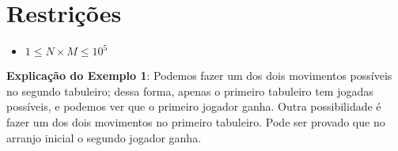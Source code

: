 
\section*{Restrições}

\begin{itemize}
\item $1 \leq N\times M \leq 10^5$
\end{itemize}

\exemplo

\bigskip
\textbf{Explicação do Exemplo 1}: Podemos fazer um dos dois movimentos possíveis no segundo tabuleiro; dessa forma, apenas o primeiro tabuleiro tem jogadas possíveis, e podemos ver que o primeiro jogador ganha. Outra possibilidade é fazer um dos dois movimentos no primeiro tabuleiro. Pode ser provado que no arranjo inicial o segundo jogador ganha.

